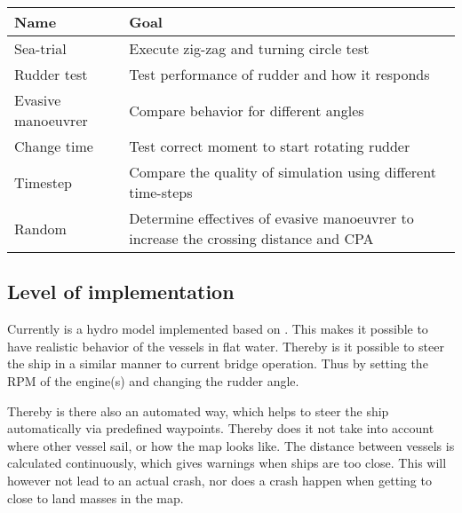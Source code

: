\begin{table}[p]
	\centering
	\begin{tabular}{p{}|p{}}
		\toprule
		Name & Goal \\
		\midrule
		Sea-trial & Execute zig-zag and turning circle test\\
		Rudder test & Test performance of rudder and how it responds \\
		Evasive manoeuvrer & Compare behavior for different angles \\
		Change time & Test correct moment to start rotating rudder \\
		Timestep & Compare the quality of simulation using different time-steps \\
		Random & Determine effectives of evasive manoeuvrer to increase the crossing distance and CPA \\
		\bottomrule
	\end{tabular}
	
	\label{tab:manoeuvring-tests}
\end{table}


\subsection{Level of implementation}
Currently is a hydro model implemented based on \cite{Artyszuk2016}. This makes it possible to have realistic behavior of the vessels in flat water. Thereby is it possible to steer the ship in a similar manner to current bridge operation. Thus by setting the RPM of the engine(s) and changing the rudder angle. 

Thereby is there also an automated way, which helps to steer the ship automatically via predefined waypoints. Thereby does it not take into account where other vessel sail, or how the map looks like. The distance between vessels is calculated continuously, which gives warnings when ships are too close. This will however not lead to an actual crash, nor does a crash happen when getting to close to land masses in the map.




